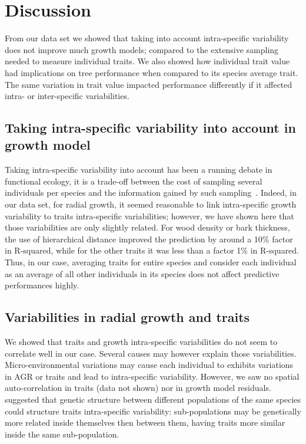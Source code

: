 \label{sec:Disc}
\section*{Discussion}

From our data set we showed that taking into account intra-specific variability does not improve much growth models; compared to the extensive sampling needed to measure individual traits. We also showed how individual trait value had implications on tree performance when compared to its species average trait. The same variation in trait value impacted performance differently if it affected intra- or inter-specific variabilities.

\subsection*{Taking intra-specific variability into account in growth model}

Taking intra-specific variability into account has been a running debate in functional ecology, it is a trade-off between the cost of sampling several individuals per species and the information gained by such sampling~\citep{albert_when_2011, violle_return_2012}. Indeed, in our data set, for radial growth, it seemed reasonable to link intra-specific growth variability to traits intra-specific variabilities; however, we have shown here that those variabilities are only slightly related. For wood density or bark thickness, the use of hierarchical distance improved the prediction by around a 10\% factor in R-squared, while for the other traits it was less than a factor 1\% in R-squared. Thus, in our case, averaging traits for entire species and consider each individual as an average of all other individuals in its species does not affect predictive performances highly.

\subsection*{Variabilities in radial growth and traits}

We showed that traits and growth intra-specific variabilities do not seem to correlate well in our case. Several causes may however explain those variabilities. Micro-environmental variations may cause each individual to exhibits variations in AGR or traits and lead to intra-specific variability. However, we saw no spatial auto-correlation in traits (data not shown) nor in growth model residuals.~\citet{albert_intraspecific_2010} suggested that genetic structure between different populations of the same species could structure traits intra-specific variability: sub-populations may be genetically more related inside themselves then between them, having traits more similar inside the same sub-population.

